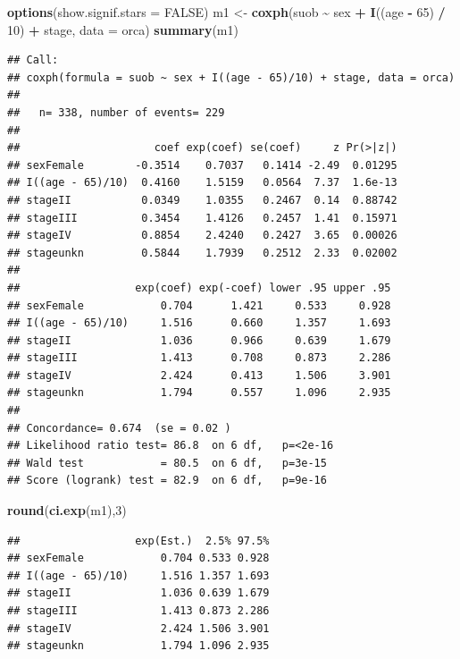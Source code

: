 \documentclass[
]{book}
\newenvironment{Shaded}{\begin{snugshade}}{\end{snugshade}}
\newcommand{\AttributeTok}[1]{\textcolor[rgb]{0.13,0.29,0.53}{#1}}
\newcommand{\ConstantTok}[1]{\textcolor[rgb]{0.56,0.35,0.01}{#1}}
\newcommand{\DecValTok}[1]{\textcolor[rgb]{0.00,0.00,0.81}{#1}}
\newcommand{\FunctionTok}[1]{\textcolor[rgb]{0.13,0.29,0.53}{\textbf{#1}}}
\newcommand{\NormalTok}[1]{#1}
\newcommand{\OtherTok}[1]{\textcolor[rgb]{0.56,0.35,0.01}{#1}}
\newcommand{\SpecialCharTok}[1]{\textcolor[rgb]{0.81,0.36,0.00}{\textbf{#1}}}
\theoremstyle{definition}
\theoremstyle{definition}
\theoremstyle{definition}
\theoremstyle{definition}
\theoremstyle{remark}
\begin{document}
\begin{Shaded}
\begin{Highlighting}[]
\FunctionTok{options}\NormalTok{(}\AttributeTok{show.signif.stars =} \ConstantTok{FALSE}\NormalTok{)}
\NormalTok{m1 }\OtherTok{\textless{}{-}} \FunctionTok{coxph}\NormalTok{(suob }\SpecialCharTok{\textasciitilde{}}\NormalTok{ sex }\SpecialCharTok{+} \FunctionTok{I}\NormalTok{((age }\SpecialCharTok{{-}} \DecValTok{65}\NormalTok{) }\SpecialCharTok{/} \DecValTok{10}\NormalTok{) }\SpecialCharTok{+}\NormalTok{ stage, }\AttributeTok{data =}\NormalTok{ orca)}
\FunctionTok{summary}\NormalTok{(m1)}
\end{Highlighting}
\end{Shaded}

\begin{verbatim}
## Call:
## coxph(formula = suob ~ sex + I((age - 65)/10) + stage, data = orca)
## 
##   n= 338, number of events= 229 
## 
##                     coef exp(coef) se(coef)     z Pr(>|z|)
## sexFemale        -0.3514    0.7037   0.1414 -2.49  0.01295
## I((age - 65)/10)  0.4160    1.5159   0.0564  7.37  1.6e-13
## stageII           0.0349    1.0355   0.2467  0.14  0.88742
## stageIII          0.3454    1.4126   0.2457  1.41  0.15971
## stageIV           0.8854    2.4240   0.2427  3.65  0.00026
## stageunkn         0.5844    1.7939   0.2512  2.33  0.02002
## 
##                  exp(coef) exp(-coef) lower .95 upper .95
## sexFemale            0.704      1.421     0.533     0.928
## I((age - 65)/10)     1.516      0.660     1.357     1.693
## stageII              1.036      0.966     0.639     1.679
## stageIII             1.413      0.708     0.873     2.286
## stageIV              2.424      0.413     1.506     3.901
## stageunkn            1.794      0.557     1.096     2.935
## 
## Concordance= 0.674  (se = 0.02 )
## Likelihood ratio test= 86.8  on 6 df,   p=<2e-16
## Wald test            = 80.5  on 6 df,   p=3e-15
## Score (logrank) test = 82.9  on 6 df,   p=9e-16
\end{verbatim}

\begin{Shaded}
\begin{Highlighting}[]
\FunctionTok{round}\NormalTok{(}\FunctionTok{ci.exp}\NormalTok{(m1),}\DecValTok{3}\NormalTok{)}
\end{Highlighting}
\end{Shaded}

\begin{verbatim}
##                  exp(Est.)  2.5% 97.5%
## sexFemale            0.704 0.533 0.928
## I((age - 65)/10)     1.516 1.357 1.693
## stageII              1.036 0.639 1.679
## stageIII             1.413 0.873 2.286
## stageIV              2.424 1.506 3.901
## stageunkn            1.794 1.096 2.935
\end{verbatim}
\end{document}
